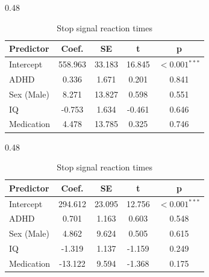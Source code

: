 \begin{table}[H]
\centering
\scriptsize
\captionsetup{labelfont=bf}
\caption{\textbf{Linear model results for model-agnostic behavioral measures}}
\label{tab:lm_all}

\begin{threeparttable}

\begin{minipage}{\linewidth}
    \begin{subtable}[t]{0.48\linewidth}
    \centering
    \caption{Go success reaction times}
    \label{tab:lm_all_a}
    \begin{tabular}{lcccc}
    \toprule
    \textbf{Predictor} & \textbf{Coef.} & \textbf{SE} & \textbf{t} & \textbf{p} \\
    \midrule
    Intercept & 558.963 & 33.183 & 16.845 & $<0.001$$^{***}$ \\
    ADHD & 0.336 & 1.671 & 0.201 & 0.841 \\
    Sex (Male) & 8.271 & 13.827 & 0.598 & 0.551 \\
    IQ & -0.753 & 1.634 & -0.461 & 0.646 \\
    Medication & 4.478 & 13.785 & 0.325 & 0.746 \\
    \bottomrule
    \end{tabular}
    \end{subtable}
\hfill
    \begin{subtable}[t]{0.48\linewidth}
    \centering
    \caption{Stop signal reaction times}
    \label{tab:lm_all_b}
    \begin{tabular}{lcccc}
    \toprule
    \textbf{Predictor} & \textbf{Coef.} & \textbf{SE} & \textbf{t} & \textbf{p} \\
    \midrule
    Intercept & 294.612 & 23.095 & 12.756 & $<0.001$$^{***}$ \\
    ADHD & 0.701 & 1.163 & 0.603 & 0.548 \\
    Sex (Male) & 4.862 & 9.624 & 0.505 & 0.615 \\
    IQ & -1.319 & 1.137 & -1.159 & 0.249 \\
    Medication & -13.122 & 9.594 & -1.368 & 0.175 \\
    \bottomrule
    \end{tabular}
    \end{subtable}

\vspace{0.3cm}


\end{minipage}
\end{threeparttable}
\end{table}
